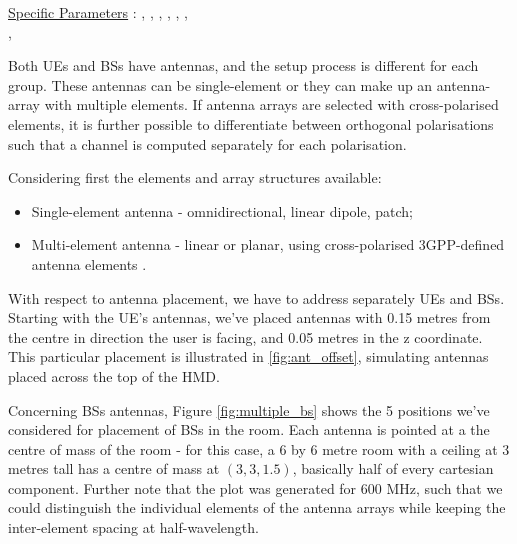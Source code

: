 \ul{Specific Parameters} \hspace{-0.3cm}:
, , , , , , \\
, 


Both \acsp{UE} and \acsp{BS} have antennas, and the setup process is different for each group. These antennas can be single-element or they can make up an antenna-array with multiple elements. If antenna arrays are selected with cross-polarised elements, it is further possible to differentiate between orthogonal polarisations such that a channel is computed separately for each polarisation.

Considering first the elements and array structures available: 

\begin{itemize}
    \item Single-element antenna - omnidirectional, linear dipole, patch;
    \item Multi-element antenna - linear or planar, using cross-polarised 3GPP-defined antenna elements \cite{3gpp.36837}.
\end{itemize}

With respect to antenna placement, we have to address separately \acsp{UE} and \acsp{BS}. Starting with the UE's antennas, we've placed antennas with 0.15 metres from the centre in direction the user is facing, and 0.05 metres in the z coordinate. This particular placement is illustrated in \ref{fig:ant_offset}, simulating antennas placed across the top of the \acs{HMD}.



Concerning \acsp{BS} antennas, Figure \ref{fig:multiple_bs} shows the 5 positions we've considered for placement of BSs in the room. Each antenna is pointed at a the centre of mass of the room - for this case, a 6 by 6 metre room with a ceiling at 3 metres tall has a centre of mass at $(3, 3, 1.5)$, basically half of every cartesian component. Further note that the plot was generated for 600 MHz, such that we could distinguish the individual elements of the antenna arrays while keeping the inter-element spacing at half-wavelength.

